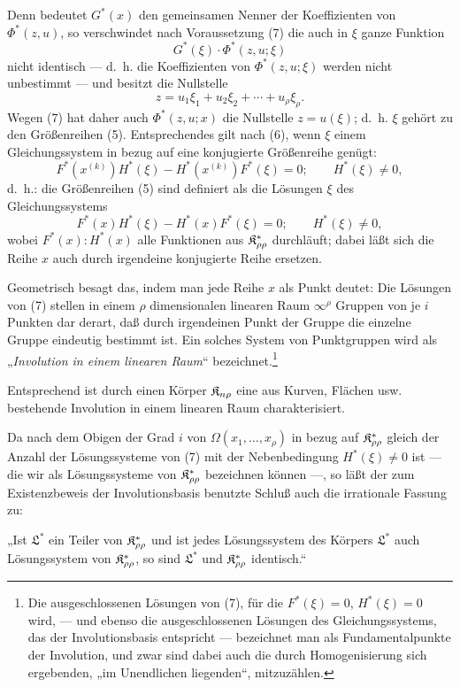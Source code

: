 Denn bedeutet $G^*(x)$ den gemeinsamen Nenner der Koeffizienten von $\Phi^*(z,u)$, so verschwindet nach Voraussetzung (7) die auch in $\xi$ ganze Funktion
\[
  G^*(\xi)\cdot\Phi^*(z,u;\xi)
\]
nicht identisch --- d.~h. die Koeffizienten von $\Phi^*(z,u;\xi)$ werden nicht unbestimmt --- und besitzt die Nullstelle
\[
  z=u_1\xi_1+u_2\xi_2+\cdots+u_\rho\xi_\rho.
\]
Wegen (7) hat daher auch $\Phi^*(z,u;x)$ die Nullstelle $z=u(\xi)$; d.~h. $\xi$ gehört zu den Größenreihen (5). Entsprechendes gilt nach (6), wenn $\xi$ einem Gleichungssystem in bezug auf eine konjugierte Größenreihe genügt:
\[
  F^*(x^{(k)})H^*(\xi)-H^*(x^{(k)})F^*(\xi)=0;
  \qquad H^*(\xi)\ne0,
\]
d.~h.: die Größenreihen (5) sind definiert als die Lösungen $\xi$ des Gleichungssystems
\[
  F^*(x)H^*(\xi)-H^*(x)F^*(\xi)=0;
  \qquad H^*(\xi)\ne0,
\]
wobei $F^*(x):H^*(x)$ alle Funktionen aus $\mathfrak{K}^*_{\rho\rho}$ durchläuft; dabei läßt sich die Reihe $x$ auch durch irgendeine konjugierte Reihe ersetzen.

Geometrisch besagt das, indem man jede Reihe $x$ als Punkt deutet: Die Lösungen von (7) stellen in einem $\rho$ dimensionalen linearen Raum $\infty^\rho$ Gruppen von je $i$ Punkten dar derart, daß durch irgendeinen Punkt der Gruppe die einzelne Gruppe eindeutig bestimmt ist. Ein solches System von Punktgruppen wird als „\emph{Involution in einem linearen Raum}“ bezeichnet.\footnote{Die ausgeschlossenen Lösungen von (7), für die $F^*(\xi)=0$, $H^*(\xi)=0$ wird, --- und ebenso die ausgeschlossenen Lösungen des Gleichungssystems, das der Involutionsbasis entspricht --- bezeichnet man als Fundamentalpunkte der Involution, und zwar sind dabei auch die durch Homogenisierung sich ergebenden, „im Unendlichen liegenden“, mitzuzählen.}

Entsprechend ist durch einen Körper $\mathfrak{K}_{n\rho}$ eine aus Kurven, Flächen usw. bestehende Involution in einem linearen Raum charakterisiert.

Da nach dem Obigen der Grad $i$ von $\Omega(x_1,
\ldots,x_\rho)$ in bezug auf $\mathfrak{K}^*_{\rho\rho}$ gleich der Anzahl der Lösungssysteme von (7) mit der Nebenbedingung $H^*(\xi)\ne0$ ist --- die wir als Lösungssysteme von $\mathfrak{K}^*_{\rho\rho}$ bezeichnen können ---, so läßt der zum Existenzbeweis der Involutionsbasis benutzte Schluß auch die irrationale Fassung zu:

„Ist $\mathfrak{L}^*$ ein Teiler von $\mathfrak{K}^*_{\rho\rho}$ und ist jedes Lösungssystem des Körpers $\mathfrak{L}^*$ auch Lösungssystem von $\mathfrak{K}^*_{\rho\rho}$, so sind $\mathfrak{L}^*$ und $\mathfrak{K}^*_{\rho\rho}$ identisch.“


